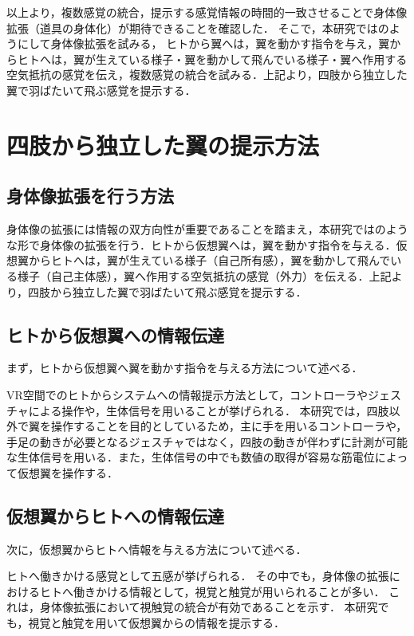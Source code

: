 \begin{small}

    以上より，複数感覚の統合，提示する感覚情報の時間的一致させることで身体像拡張（道具の身体化）が期待できることを確認した．
    そこで，本研究ではのようにして身体像拡張を試みる，
    ヒトから翼へは，翼を動かす指令を与え，翼からヒトへは，翼が生えている様子・翼を動かして飛んでいる様子・翼へ作用する空気抵抗の感覚を伝え，複数感覚の統合を試みる．上記より，四肢から独立した翼で羽ばたいて飛ぶ感覚を提示する．


\section{四肢から独立した翼の提示方法}

  \subsection{身体像拡張を行う方法}
    身体像の拡張には情報の双方向性が重要であることを踏まえ，本研究ではのような形で身体像の拡張を行う．ヒトから仮想翼へは，翼を動かす指令を与える．仮想翼からヒトへは，翼が生えている様子（自己所有感），翼を動かして飛んでいる様子（自己主体感），翼へ作用する空気抵抗の感覚（外力）を伝える．上記より，四肢から独立した翼で羽ばたいて飛ぶ感覚を提示する．

  \subsection{ヒトから仮想翼への情報伝達}
    まず，ヒトから仮想翼へ翼を動かす指令を与える方法について述べる．

    VR空間でのヒトからシステムへの情報提示方法として，コントローラやジェスチャによる操作や，生体信号を用いることが挙げられる．
    本研究では，四肢以外で翼を操作することを目的としているため，主に手を用いるコントローラや，手足の動きが必要となるジェスチャではなく，四肢の動きが伴わずに計測が可能な生体信号を用いる．また，生体信号の中でも数値の取得が容易な筋電位によって仮想翼を操作する．

  \subsection{仮想翼からヒトへの情報伝達}
    次に，仮想翼からヒトへ情報を与える方法について述べる．

    ヒトへ働きかける感覚として五感が挙げられる．
    その中でも，身体像の拡張におけるヒトへ働きかける情報として，視覚と触覚が用いられることが多い．
    これは，身体像拡張において視触覚の統合が有効であることを示す．
    本研究でも，視覚と触覚を用いて仮想翼からの情報を提示する．
   


\end{small}

